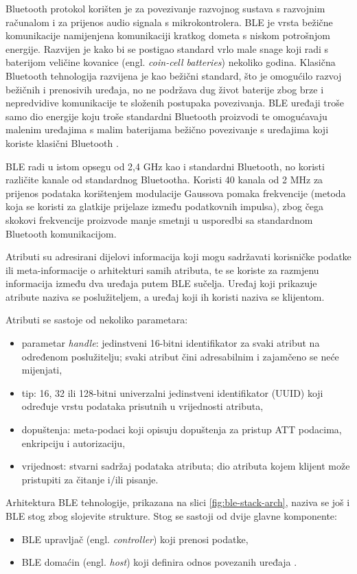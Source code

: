 Bluetooth protokol korišten je za povezivanje razvojnog sustava s razvojnim računalom i za prijenos audio signala s mikrokontrolera. BLE je vrsta bežične komunikacije namijenjena komunikaciji kratkog dometa s niskom potrošnjom energije. Razvijen je kako bi se postigao standard vrlo male snage koji radi s baterijom veličine kovanice (engl. \textit{coin-cell batteries}) nekoliko godina.
Klasična Bluetooth tehnologija razvijena je kao bežični standard, što je omogućilo razvoj bežičnih i prenosivih uređaja, no ne podržava dug život baterije zbog brze i nepredvidive komunikacije te složenih postupaka povezivanja. BLE uređaji troše samo dio energije koju troše standardni Bluetooth proizvodi te omogućavaju malenim uređajima s malim baterijama bežično povezivanje s uređajima koji koriste klasični Bluetooth \cite{blevsbluetooth}. 

BLE radi u istom opsegu od 2,4 GHz kao i standardni Bluetooth, no koristi različite kanale od standardnog Bluetootha. Koristi 40 kanala od 2 MHz za prijenos podataka korištenjem modulacije Gaussova pomaka frekvencije (metoda koja se koristi za glatkije prijelaze između podatkovnih impulsa), zbog čega skokovi frekvencije proizvode manje smetnji u usporedbi sa standardnom Bluetooth komunikacijom.

Atributi su adresirani dijelovi informacija koji mogu sadržavati korisničke podatke ili meta-informacije o arhitekturi samih atributa, te se koriste za razmjenu informacija između dva uređaja putem BLE sučelja. Uređaj koji prikazuje atribute naziva se poslužiteljem, a uređaj koji ih koristi naziva se klijentom. 

Atributi se sastoje od nekoliko parametara:
\begin{itemize}
	\item parametar \textit{handle}: jedinstveni 16-bitni identifikator za svaki atribut na određenom poslužitelju; svaki atribut čini adresabilnim i zajamčeno se neće mijenjati,
	\item tip: 16, 32 ili 128-bitni univerzalni jedinstveni identifikator (UUID) koji određuje vrstu podataka prisutnih u vrijednosti atributa,
	\item dopuštenja: meta-podaci koji opisuju dopuštenja za pristup ATT podacima, enkripciju i autorizaciju,
	\item vrijednost: stvarni sadržaj podataka atributa; dio atributa kojem klijent može pristupiti za čitanje i/ili pisanje.
\end{itemize}

Arhitektura BLE tehnologije, prikazana na slici \ref{fig:ble-stack-arch}, naziva se još i BLE stog zbog slojevite strukture. Stog se sastoji od dvije glavne komponente:
\begin{itemize}
	\item BLE upravljač (engl. \textit{controller}) koji prenosi podatke,
	\item BLE domaćin (engl. \textit{host}) koji definira odnos povezanih uređaja  \cite{blemanual}.
\end{itemize}


